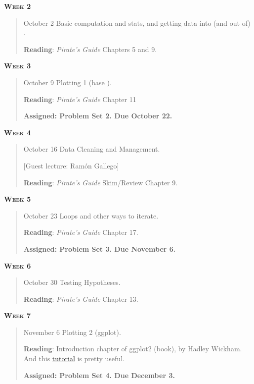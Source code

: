 \documentclass[11pt,letterpaper]{article}
\begin{document}
\textbf{\textsc{Week 2}}
		\begin{quote}	
		October 2  \textbullet \space Basic computation and stats, and getting data into (and out of) \R. 
		
		\textbf{Reading}: \textit{Pirate's Guide} Chapters 5 and 9.	
		\end{quote}

\textbf{\textsc{Week 3}}
		\begin{quote}	
		October 9  \textbullet \space Plotting 1 (base \R). 
		
		\textbf{Reading}: \textit{Pirate's Guide} Chapter 11

		\textbf{Assigned: Problem Set 2.  Due October 22.}

		\end{quote}

\textbf{\textsc{Week 4}}
		\begin{quote}	
		October 16  \textbullet \space Data Cleaning and Management. 
		
		[Guest lecture: Ramón Gallego]
		
		\textbf{Reading}: \textit{Pirate's Guide} Skim/Review Chapter 9.
		\end{quote}


\textbf{\textsc{Week 5}}
		\begin{quote}	
		October 23  \textbullet \space Loops and other ways to iterate. 
		
		\textbf{Reading}: \textit{Pirate's Guide} Chapter 17.

		\textbf{Assigned: Problem Set 3.  Due November 6.}

		\end{quote}

\textbf{\textsc{Week 6}}
		\begin{quote}	
		October 30  \textbullet \space Testing Hypotheses. 
		
		\textbf{Reading}: \textit{Pirate's Guide} Chapter 13.
		\end{quote}


\textbf{\textsc{Week 7}}
		\begin{quote}	
		November 6  \textbullet \space Plotting 2 (ggplot). 
		
		\textbf{Reading}: Introduction chapter of ggplot2 (book), by Hadley Wickham.  And this \href{http://r-statistics.co/Complete-Ggplot2-Tutorial-Part1-With-R-Code.html}{\underline{tutorial}} is pretty useful.

		\textbf{Assigned: Problem Set 4.  Due December 3.}

		\end{quote}
\end{document}
